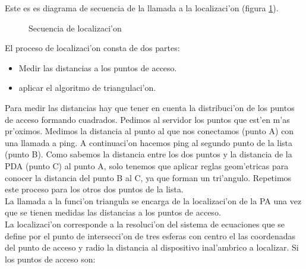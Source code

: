 Este es es diagrama de secuencia de la llamada a la localizaci'on (figura \ref{fig:localizador}).
\begin{figure}[h!]
	\begin{center}
     	\end{center}
    	\caption{Secuencia de localizaci'on}
	\label{fig:localizador}
\end{figure}

El proceso de localizaci'on consta de dos partes:
\begin{itemize}
\item Medir las distancias a los puntos de acceso.
\item aplicar el algoritmo de triangulaci'on.
\end{itemize}
Para medir las distancias hay que tener en cuenta la distribuci'on de los puntos de acceso formando cuadrados.
Pedimos al servidor los puntos que est'en m'as pr'oximos. Medimos la distancia al punto al que nos conectamos (punto A) con una llamada a ping. A continuaci'on hacemos ping al segundo punto de la lista (punto B). Como sabemos la distancia entre los dos puntos y la distancia de la PDA (punto C) al punto A, solo tenemos que aplicar reglas geom'etricas para conocer la distancia del punto B al C, ya que forman un tri'angulo. 
Repetimos este proceso para los otros dos puntos de la lista.\bigskip \\ La llamada a la funci'on triangula se encarga de la localizaci'on de la PA una vez que se tienen medidas las distancias a los puntos de acceso.\bigskip \\ La localizaci'on corresponde a la resoluci'on del sistema de ecuaciones que se define por el punto de intersecci'on de tres esferas con centro el las coordenadas del punto de acceso y radio la distancia al dispositivo inal'ambrico a localizar. Si los puntos de acceso son:

